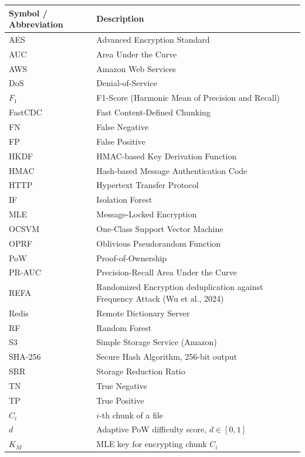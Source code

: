 \documentclass[12pt,a4paper,oneside]{report}
\begin{document}
\begin{longtable}{L{3cm}L{11cm}}
\toprule
\textbf{Symbol / Abbreviation} & \textbf{Description} \\
\midrule
\endhead
\bottomrule
\endfoot
AES        & Advanced Encryption Standard \\
AUC        & Area Under the Curve \\
AWS        & Amazon Web Services \\
DoS        & Denial-of-Service \\
$F_1$      & F1-Score (Harmonic Mean of Precision and Recall) \\
FastCDC    & Fast Content-Defined Chunking \\
FN         & False Negative \\
FP         & False Positive \\
HKDF       & HMAC-based Key Derivation Function \\
HMAC       & Hash-based Message Authentication Code \\
HTTP       & Hypertext Transfer Protocol \\
IF         & Isolation Forest \\
MLE        & Message-Locked Encryption \\
OCSVM      & One-Class Support Vector Machine \\
OPRF       & Oblivious Pseudorandom Function \\
PoW        & Proof-of-Ownership \\
PR-AUC     & Precision-Recall Area Under the Curve \\
REFA       & Randomized Encryption deduplication against Frequency Attack (Wu et al., 2024) \\
Redis      & Remote Dictionary Server \\
RF         & Random Forest \\
S3         & Simple Storage Service (Amazon) \\
SHA-256    & Secure Hash Algorithm, 256-bit output \\
SRR        & Storage Reduction Ratio \\
TN         & True Negative \\
TP         & True Positive \\
\midrule
$C_i$      & $i$-th chunk of a file \\
$d$        & Adaptive PoW difficulty score, $d \in [0,1]$ \\
$K_M$      & MLE key for encrypting chunk $C_i$ \\

\end{longtable}
\end{document}

